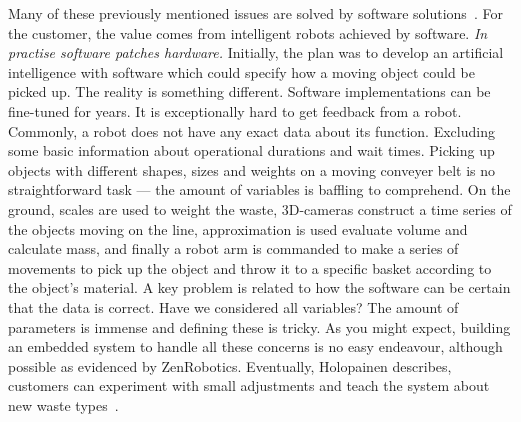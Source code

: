 \documentclass[english]{tktltiki2}
\begin{document}
Many of these previously mentioned issues are solved by software solutions~\cite{Hol15a}. For the customer, the value comes from intelligent robots achieved by software. \emph{In practise software patches hardware.} Initially, the plan was to develop an artificial intelligence with software which could specify how a moving object could be picked up. The reality is something different. Software implementations can be fine-tuned for years. It is exceptionally hard to get feedback from a robot. Commonly, a robot does not have any exact data about its function. Excluding some basic information about operational durations and wait times. Picking up objects with different shapes, sizes and weights on a moving conveyer belt is no straightforward task — the amount of variables is baffling to comprehend. On the ground, scales are used to weight the waste, 3D-cameras construct a time series of the objects moving on the line, approximation is used evaluate volume and calculate mass, and finally a robot arm is commanded to make a series of movements to pick up the object and throw it to a specific basket according to the object’s material. A key problem is related to how the software can be certain that the data is correct. Have we considered all variables? The amount of parameters is immense and defining these is tricky. As you might expect, building an embedded system to handle all these concerns is no easy endeavour, although possible as evidenced by ZenRobotics. Eventually, Holopainen describes, customers can experiment with small adjustments and teach the system about new waste types~\cite{Hol15a}.
\end{document}
